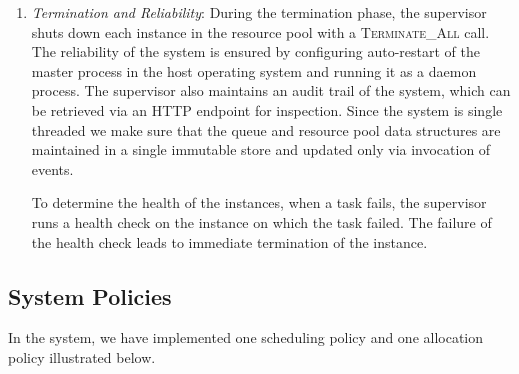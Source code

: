 \documentclass[a4paper]{IEEEtran}
\begin{document}
\begin{enumerate}
  \item \emph{Termination and Reliability}: During the termination phase, the supervisor shuts down each instance in
  the resource pool with a \textsc{Terminate\_All} call. The reliability of the system is ensured by configuring auto-restart
  of the master process in the host operating system and running it as a daemon process. The supervisor also maintains
  an audit trail of the system, which can be retrieved via an HTTP endpoint for inspection. Since the system is
  single threaded we make sure that the queue and resource pool data structures are maintained in a single
  immutable store and updated only via invocation of events.
  
  To determine the health of the instances, when a task fails, the supervisor runs a health check on the instance
  on which the task failed. The failure of the health check leads to immediate termination of the instance.

\end{enumerate}

\subsection{System Policies}

In the system, we have implemented one scheduling policy and one allocation policy illustrated below.
\end{document}
